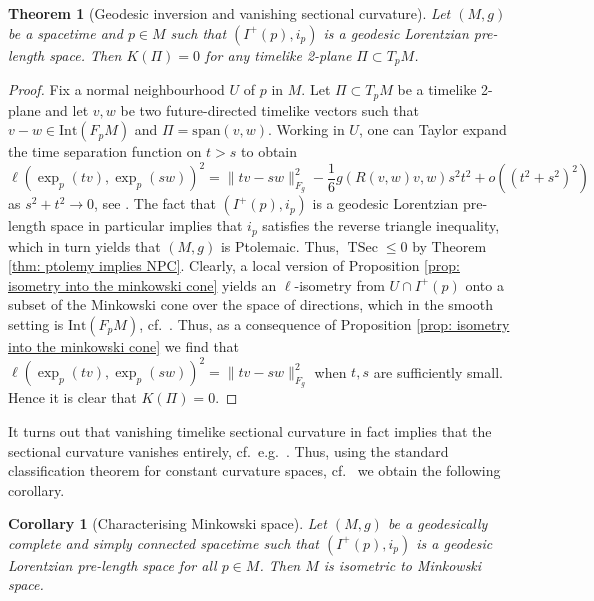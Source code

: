 \documentclass[hidelinks,12pt,a4paper]{article}
\numberwithin{equation}{section}
\theoremstyle{plain}
\newtheorem{theorem}[definition]{Theorem}
\newtheorem{corollary}[definition]{Corollary}
\theoremstyle{definition}
\newcommand{\Int}{\mathrm{Int}}
\newcommand{\LpLS}{Lo\-rentz\-ian pre-length space }
\newcommand{\LpLSn}{Lo\-rentz\-ian pre-length space}
\DeclareMathOperator{\TSec}{TSec}
\begin{document}
\begin{theorem}[Geodesic inversion and vanishing sectional curvature]
Let $(M,g)$ be a spacetime and $p \in M$ such that $(I^+(p),i_p)$ is a geodesic \LpLSn. Then $K(\Pi)=0$ for any timelike \emph{2}-plane $\Pi \subset T_pM$.
\end{theorem}

\begin{proof}
Fix a normal neighbourhood $U$ of $p$ in $M$. Let $\Pi \subset T_pM$ be a timelike 2-plane and let $v, w$ be two future-directed timelike vectors such that $v-w \in \Int(F_pM)$ and $\Pi= \text{span}(v,w)$. Working in $U$, one can Taylor expand the time separation function on $t>s$ to obtain
\begin{equation}
    \ell( \exp_p (tv), \exp_p(sw)) ^2  = \| tv- sw\|^2 _{F_g} - \frac{1}{6} g(R(v,w)v,w) s^2t^2 + o( (t^2+s^2)^2)
\end{equation}
as $s^2+t^2 \rightarrow 0$, see \cite[Page 7]{mccann2025tradinglinearityellipticitynonsmooth}. 
The fact that $(I^+(p),i_p)$ is a geodesic \LpLS in particular implies that $i_p$ satisfies the reverse triangle inequality, which in turn yields that $(M,g)$ is Ptolemaic. 
Thus, $\TSec \leq 0$ by Theorem \ref{thm: ptolemy implies NPC}. 
Clearly, a local version of Proposition \ref{prop: isometry into the minkowski cone} yields an $\ell$-isometry from $U \cap I^+(p)$ onto a subset of the Minkowski cone over the space of directions, which in the smooth setting is $\Int(F_pM)$, cf.\ \cite[Lemma 3.24]{BS23}. 
Thus, as a consequence of Proposition \ref{prop: isometry into the minkowski cone} we find that $\ell( \exp_p (tv), \exp_p(sw)) ^2  = \| tv- sw\|^2 _{F_g}$ when $t,s$ are sufficiently small. 
Hence it is clear that $K(\Pi)=0$.
\end{proof}

It turns out that vanishing timelike sectional curvature in fact implies that the sectional curvature vanishes entirely, cf.\ e.g.\ \cite{NomDaj}. 
Thus, using the standard classification theorem for constant curvature spaces, cf.\ \cite[Corollary 8.26]{One83}
we obtain the following corollary. 

\begin{corollary}[Characterising Minkowski space]
Let $(M,g)$ be a geodesically complete and simply connected spacetime such that $(I^+(p), i_p)$ is a geodesic \LpLS for all $p \in M$. 
Then $M$ is isometric to Minkowski space. 
\end{corollary}
\end{document}
